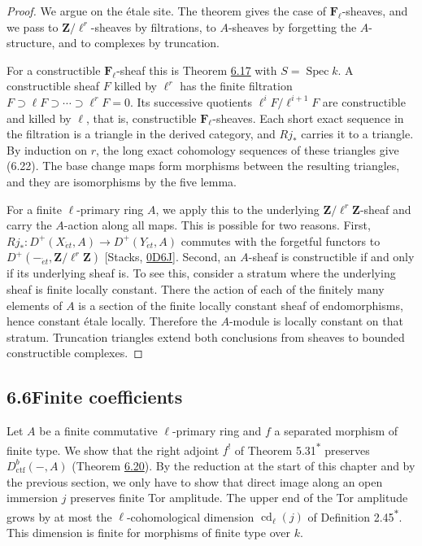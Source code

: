 \documentclass[11pt]{article}
\newcommand{\bpout}[1]{#1\textsuperscript{\hyperlink{bp-outside}{\ensuremath{\ast}}}}
\providecommand{\Fell}{}\renewcommand{\Fell}{\mathbf F_\ell}
\begin{document}
\begin{proof}[{Proof}]\label{bp55}%
We argue on the étale site. The theorem gives the case of \(\Fell\)-sheaves, and we pass to \(\mathbf Z/\ell^r\)-sheaves by filtrations, to \(A\)-sheaves by forgetting the \(A\)-structure, and to complexes by truncation.

For a constructible \(\Fell\)-sheaf this is Theorem \hyperref[bp51]{6.17} with \(S=\operatorname{Spec}k\). A constructible sheaf \(F\) killed by \(\ell^r\) has the finite filtration \(F\supset\ell F\supset\cdots\supset\ell^rF=0\). Its successive quotients \(\ell^iF/\ell^{i+1}F\) are constructible and killed by \(\ell\), that is, constructible \(\Fell\)-sheaves. Each short exact sequence in the filtration is a triangle in the derived category, and \(Rj_*\) carries it to a triangle. By induction on \(r\), the long exact cohomology sequences of these triangles give (6.22). The base change maps form morphisms between the resulting triangles, and they are isomorphisms by the five lemma.

For a finite \(\ell\)-primary ring \(A\), we apply this to the underlying \(\mathbf Z/\ell^r\mathbf Z\)-sheaf and carry the \(A\)-action along all maps. This is possible for two reasons. First, \(Rj_*:D^+(X_{\acute{e}t},A)\to D^+(Y_{\acute{e}t},A)\) commutes with the forgetful functors to \(D^+(-_{\acute{e}t},\mathbf Z/\ell^r\mathbf Z)\) [Stacks, \href{https://stacks.math.columbia.edu/tag/0D6J}{0D6J}]. Second, an \(A\)-sheaf is constructible if and only if its underlying sheaf is. To see this, consider a stratum where the underlying sheaf is finite locally constant. There the action of each of the finitely many elements of \(A\) is a section of the finite locally constant sheaf of endomorphisms, hence constant étale locally. Therefore the \(A\)-module is locally constant on that stratum. Truncation triangles extend both conclusions from sheaves to bounded constructible complexes.
\end{proof}


\subsection*{\texorpdfstring{6.6\quad Finite coefficients}{6.6 Finite coefficients}}
\label{bp56}%
\label{bp57}%
Let \(A\) be a finite commutative \(\ell\)-primary ring and \(f\) a separated morphism of finite type. We show that the right adjoint \(f^!\) of Theorem \bpout{5.31} preserves \(D^b_{\mathrm{ctf}}(-,A)\) (Theorem \hyperref[bp61]{6.20}). By the reduction at the start of this chapter and by the previous section, we only have to show that direct image along an open immersion \(j\) preserves finite Tor amplitude. The upper end of the Tor amplitude grows by at most the \(\ell\)-cohomological dimension \(\operatorname{cd}_\ell(j)\) of Definition \bpout{2.45}. This dimension is finite for morphisms of finite type over \(k\).
\end{document}
